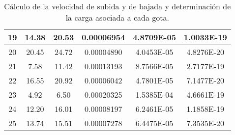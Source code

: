 \documentclass{article}
\begin{document}
\begin{enumerate}
\begin{table}[h!]
\begin{tabular}{|c|c|c|c|c|c|}
       \hline
       19  & 14.38 & 20.53 & 0.00006954 & 4.8709E-05 & 1.0033E-19 \\        
       \hline
       20  & 20.45 & 24.72 & 0.00004890 & 4.0453E-05 & 4.8276E-20 \\        
       \hline
       21  & 7.58 & 11.42 & 0.00013193 & 8.7566E-05 & 2.7177E-19 \\        
       \hline
       22  & 16.55 & 20.92 & 0.00006042 & 4.7801E-05 & 7.1477E-20 \\        
       \hline
       23  & 4.92 & 6.50 & 0.00020325 & 1.5385E-04 & 4.6661E-19 \\        
       \hline
       24  & 12.20 & 16.01 & 0.00008197 & 6.2461E-05 & 1.1858E-19 \\        
       \hline
       25  & 13.74 & 15.51 & 0.00007278 & 6.4475E-05 & 7.3535E-20 \\        
\hline
    \end{tabular}
    \caption{Cálculo de la velocidad de subida y de bajada y determinación de la carga asociada a cada gota.}
    \label{tab:my_label}
\end{table}




\end{enumerate}
\end{document}
